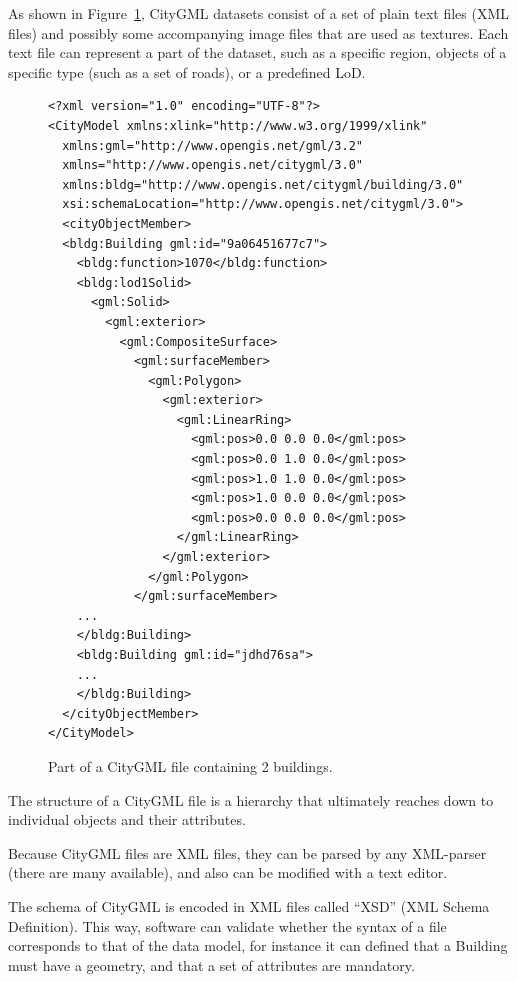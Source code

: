 As shown in Figure~\ref{fig:citygml_file}, CityGML datasets consist of a set of plain text files (XML files) and possibly some accompanying image files that are used as textures. 
Each text file can represent a part of the dataset, such as a specific region, objects of a specific type (such as a set of roads), or a predefined LoD\@.
\begin{figure}
\begin{lstlisting}
<?xml version="1.0" encoding="UTF-8"?>
<CityModel xmlns:xlink="http://www.w3.org/1999/xlink" 
  xmlns:gml="http://www.opengis.net/gml/3.2" 
  xmlns="http://www.opengis.net/citygml/3.0" 
  xmlns:bldg="http://www.opengis.net/citygml/building/3.0"  
  xsi:schemaLocation="http://www.opengis.net/citygml/3.0">
  <cityObjectMember>
  <bldg:Building gml:id="9a06451677c7">
    <bldg:function>1070</bldg:function>
    <bldg:lod1Solid>
      <gml:Solid>
        <gml:exterior>
          <gml:CompositeSurface>
            <gml:surfaceMember>
              <gml:Polygon>
                <gml:exterior>
                  <gml:LinearRing>
                    <gml:pos>0.0 0.0 0.0</gml:pos>
                    <gml:pos>0.0 1.0 0.0</gml:pos>
                    <gml:pos>1.0 1.0 0.0</gml:pos>
                    <gml:pos>1.0 0.0 0.0</gml:pos>
                    <gml:pos>0.0 0.0 0.0</gml:pos>
                  </gml:LinearRing>
                </gml:exterior>
              </gml:Polygon>
            </gml:surfaceMember>
    ...
    </bldg:Building>
    <bldg:Building gml:id="jdhd76sa">
    ...
    </bldg:Building>
  </cityObjectMember>
</CityModel>
\end{lstlisting}
\caption{Part of a CityGML file containing 2 buildings.}%
\label{fig:citygml_file}
\end{figure}
The structure of a CityGML file is a hierarchy that ultimately reaches down to individual objects and their attributes. 

Because CityGML files are XML files, they can be parsed by any XML-parser (there are many available), and also can be modified with a text editor.

The schema of CityGML is encoded in XML files called ``XSD'' (XML Schema Definition).
This way, software can validate whether the syntax of a file corresponds to that of the data model, for instance it can defined that a Building must have a geometry, and that a set of attributes are mandatory.


